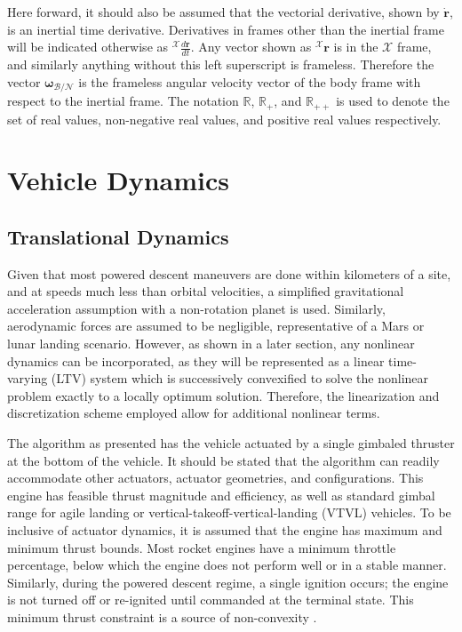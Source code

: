 \documentclass[conf]{new-aiaa}
\begin{document}
Here forward, it should also be assumed that the vectorial derivative, shown by $\mathbf{\dot{r}}$, is an inertial time derivative. Derivatives in frames other than the inertial frame will be indicated otherwise as $^\mathcal{X}\frac{d \mathbf{r}}{dt}$. Any vector shown as $^\mathcal{X}\mathbf{r}$ is in the $\mathcal{X}$ frame, and similarly anything without this left superscript is frameless. Therefore the vector $\bm{\omega}_{\mathcal{B/N}}$ is the frameless angular velocity vector of the body frame with respect to the inertial frame. The notation $\mathbb{R}$, $\mathbb{R}_+$, and $\mathbb{R}_{++}$ is used to denote the set of real values, non-negative real values, and positive real values respectively.


\section{Vehicle Dynamics}
\subsection{Translational Dynamics}
Given that most powered descent maneuvers are done within kilometers of a site, and at speeds much less than orbital velocities, a simplified gravitational acceleration assumption with a non-rotation planet is used. Similarly, aerodynamic forces are assumed to be negligible, representative of a Mars or lunar landing scenario. However, as shown in a later section, any nonlinear dynamics can be incorporated, as they will be represented as a linear time-varying (LTV) system which is successively convexified to solve the nonlinear problem exactly to a locally optimum solution. Therefore, the linearization and discretization scheme employed allow for additional nonlinear terms. 

The algorithm as presented has the vehicle actuated by a single gimbaled thruster at the bottom of the vehicle. It should be stated that the algorithm can readily accommodate other actuators, actuator geometries, and configurations. This engine has feasible thrust magnitude and efficiency, as well as standard gimbal range for agile landing or vertical-takeoff-vertical-landing (VTVL) vehicles. To be inclusive of actuator dynamics, it is assumed that the engine has maximum and minimum thrust bounds. Most rocket engines have a minimum throttle percentage, below which the engine does not perform well or in a stable manner. Similarly, during the powered descent regime, a single ignition occurs; the engine is not turned off or re-ignited until commanded at the terminal state. This minimum thrust constraint is a source of non-convexity \cite{accikmecse2011lossless}.
\end{document}
